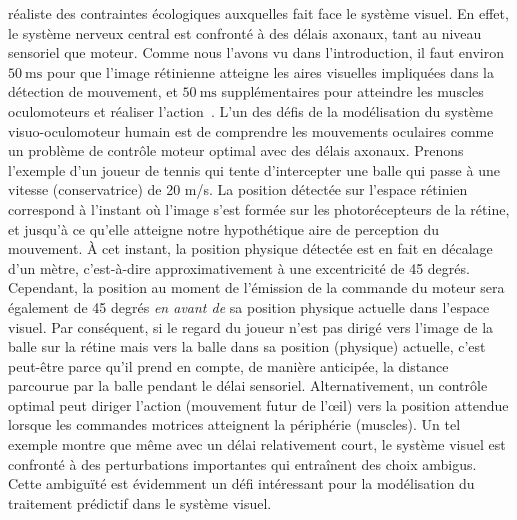 \documentclass[11pt,french,a4paper,oneside]{article}%
\newcommand{\ms}{\si{\milli\second}}%
\begin{document}
réaliste des contraintes écologiques auxquelles fait face le système
visuel. En effet, le système nerveux central est confronté à des délais
axonaux, tant au niveau sensoriel que moteur. Comme nous l'avons vu dans
l'introduction, il faut environ $50~\ms$ pour que l'image rétinienne
atteigne les aires visuelles impliquées dans la détection de mouvement,
et $50~\ms$ supplémentaires pour atteindre les muscles oculomoteurs et
réaliser l'action~\citep{Kirchner06}. L'un des défis de la
modélisation du système visuo-oculomoteur humain est de comprendre les
mouvements oculaires comme un problème de contrôle moteur optimal avec
des délais axonaux. Prenons l'exemple d'un joueur de tennis qui tente
d'intercepter une balle qui passe à une vitesse (conservatrice) de 20
m/s. La position détectée sur l'espace rétinien correspond à l'instant
où l'image s'est formée sur les photorécepteurs de la rétine, et jusqu'à
ce qu'elle atteigne notre hypothétique aire de perception du mouvement.
À cet instant, la position physique détectée est en fait en décalage d'un
mètre, c'est-à-dire approximativement à une excentricité de 45 degrés.
Cependant, la position au moment de l'émission de la commande du moteur
sera également de 45 degrés \emph{en avant de} sa position physique
actuelle dans l'espace visuel. Par conséquent, si le regard du joueur
n'est pas dirigé vers l'image de la balle sur la rétine mais vers la
balle dans sa position (physique) actuelle, c'est peut-être parce qu'il
prend en compte, de manière anticipée, la distance parcourue par la
balle pendant le délai sensoriel. Alternativement, un contrôle optimal
peut diriger l'action (mouvement futur de l'œil) vers la position
attendue lorsque les commandes motrices atteignent la périphérie
(muscles). Un tel exemple montre que même avec un délai relativement
court, le système visuel est confronté à des perturbations importantes
qui entraînent des choix ambigus. Cette ambiguïté est évidemment un défi
intéressant pour la modélisation du traitement prédictif dans le système
visuel.
\end{document}

